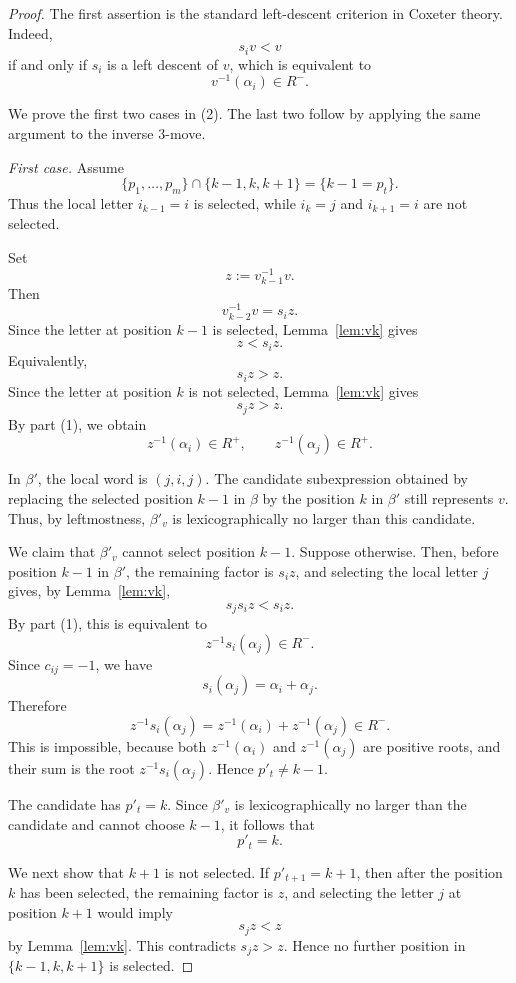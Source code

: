 \documentclass[10pt,a4paper]{amsart}
\begin{document}
\begin{proof}
The first assertion is the standard left-descent criterion in Coxeter theory.
Indeed,
\[
s_i v<v
\]
if and only if \(s_i\) is a left descent of \(v\), which is equivalent to
\[
v^{-1}(\alpha_i)\in R^-.
\]

We prove the first two cases in (2). The last two follow by applying the same
argument to the inverse \(3\)-move.

\medskip
\noindent
\emph{First case.}
Assume
\[
\{p_1,\dots,p_m\}\cap\{k-1,k,k+1\}
=
\{k-1=p_t\}.
\]
Thus the local letter \(i_{k-1}=i\) is selected, while \(i_k=j\) and
\(i_{k+1}=i\) are not selected.

Set
\[
z:=v_{k-1}^{-1}v.
\]
Then
\[
v_{k-2}^{-1}v=s_i z.
\]
Since the letter at position \(k-1\) is selected, Lemma~\ref{lem:vk} gives
\[
z<s_i z.
\]
Equivalently,
\[
s_i z>z.
\]
Since the letter at position \(k\) is not selected, Lemma~\ref{lem:vk} gives
\[
s_j z>z.
\]
By part (1), we obtain
\[
z^{-1}(\alpha_i)\in R^+,
\qquad
z^{-1}(\alpha_j)\in R^+.
\]

In \(\beta'\), the local word is \((j,i,j)\). The candidate subexpression
obtained by replacing the selected position \(k-1\) in \(\beta\) by the
position \(k\) in \(\beta'\) still represents \(v\). Thus, by leftmostness,
\(\beta'_v\) is lexicographically no larger than this candidate.

We claim that \(\beta'_v\) cannot select position \(k-1\). Suppose otherwise.
Then, before position \(k-1\) in \(\beta'\), the remaining factor is \(s_i z\),
and selecting the local letter \(j\) gives, by Lemma~\ref{lem:vk},
\[
s_js_i z<s_i z.
\]
By part (1), this is equivalent to
\[
z^{-1}s_i(\alpha_j)\in R^-.
\]
Since \(c_{ij}=-1\), we have
\[
s_i(\alpha_j)=\alpha_i+\alpha_j.
\]
Therefore
\[
z^{-1}s_i(\alpha_j)
=
z^{-1}(\alpha_i)+z^{-1}(\alpha_j)\in R^-.
\]
This is impossible, because both \(z^{-1}(\alpha_i)\) and
\(z^{-1}(\alpha_j)\) are positive roots, and their sum is the root
\(z^{-1}s_i(\alpha_j)\). Hence \(p'_t\neq k-1\).

The candidate has \(p'_t=k\). Since \(\beta'_v\) is lexicographically no larger
than the candidate and cannot choose \(k-1\), it follows that
\[
p'_t=k.
\]

We next show that \(k+1\) is not selected. If \(p'_{t+1}=k+1\), then after the
position \(k\) has been selected, the remaining factor is \(z\), and selecting
the letter \(j\) at position \(k+1\) would imply
\[
s_jz<z
\]
by Lemma~\ref{lem:vk}. This contradicts \(s_jz>z\). Hence no further position
in \(\{k-1,k,k+1\}\) is selected.


\end{proof}
\end{document}
